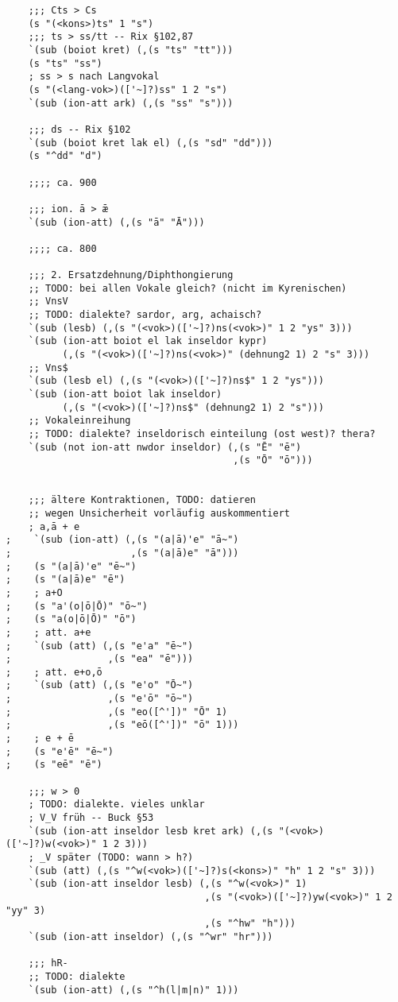 \begin{verbatim}
    ;;; Cts > Cs
    (s "(<kons>)ts" 1 "s")
    ;;; ts > ss/tt -- Rix §102,87
    `(sub (boiot kret) (,(s "ts" "tt")))
    (s "ts" "ss")
    ; ss > s nach Langvokal
    (s "(<lang-vok>)(['~]?)ss" 1 2 "s")
    `(sub (ion-att ark) (,(s "ss" "s")))

    ;;; ds -- Rix §102
    `(sub (boiot kret lak el) (,(s "sd" "dd")))
    (s "^dd" "d")

    ;;;; ca. 900

    ;;; ion. ā > ǣ
    `(sub (ion-att) (,(s "ā" "Ā")))

    ;;;; ca. 800

    ;;; 2. Ersatzdehnung/Diphthongierung
    ;; TODO: bei allen Vokale gleich? (nicht im Kyrenischen)
    ;; VnsV
    ;; TODO: dialekte? sardor, arg, achaisch?
    `(sub (lesb) (,(s "(<vok>)(['~]?)ns(<vok>)" 1 2 "ys" 3)))
    `(sub (ion-att boiot el lak inseldor kypr)
          (,(s "(<vok>)(['~]?)ns(<vok>)" (dehnung2 1) 2 "s" 3)))
    ;; Vns$
    `(sub (lesb el) (,(s "(<vok>)(['~]?)ns$" 1 2 "ys")))
    `(sub (ion-att boiot lak inseldor)
          (,(s "(<vok>)(['~]?)ns$" (dehnung2 1) 2 "s")))
    ;; Vokaleinreihung
    ;; TODO: dialekte? inseldorisch einteilung (ost west)? thera?
    `(sub (not ion-att nwdor inseldor) (,(s "Ē" "ē")
                                        ,(s "Ō" "ō")))


    ;;; ältere Kontraktionen, TODO: datieren
    ;; wegen Unsicherheit vorläufig auskommentiert
    ; a,ā + e
;    `(sub (ion-att) (,(s "(a|ā)'e" "ā~")
;                     ,(s "(a|ā)e" "ā")))
;    (s "(a|ā)'e" "ē~")
;    (s "(a|ā)e" "ē")
;    ; a+O
;    (s "a'(o|ō|Ō)" "ō~")
;    (s "a(o|ō|Ō)" "ō")
;    ; att. a+e
;    `(sub (att) (,(s "e'a" "ē~")
;                 ,(s "ea" "ē")))
;    ; att. e+o,ō
;    `(sub (att) (,(s "e'o" "Ō~")
;                 ,(s "e'ō" "ō~")
;                 ,(s "eo([^'])" "Ō" 1)
;                 ,(s "eō([^'])" "ō" 1)))
;    ; e + ē
;    (s "e'ē" "ē~")
;    (s "eē" "ē")

    ;;; w > 0
    ; TODO: dialekte. vieles unklar
    ; V_V früh -- Buck §53
    `(sub (ion-att inseldor lesb kret ark) (,(s "(<vok>)(['~]?)w(<vok>)" 1 2 3)))
    ; _V später (TODO: wann > h?)
    `(sub (att) (,(s "^w(<vok>)(['~]?)s(<kons>)" "h" 1 2 "s" 3)))
    `(sub (ion-att inseldor lesb) (,(s "^w(<vok>)" 1)
                                   ,(s "(<vok>)(['~]?)yw(<vok>)" 1 2 "yy" 3)
                                   ,(s "^hw" "h")))
    `(sub (ion-att inseldor) (,(s "^wr" "hr")))

    ;;; hR-
    ;; TODO: dialekte
    `(sub (ion-att) (,(s "^h(l|m|n)" 1)))


\end{verbatim}

